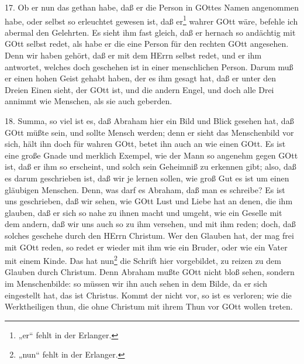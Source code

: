 17. Ob er nun das gethan habe, daß er die Person in GOttes Namen angenommen habe, oder selbst so erleuchtet gewesen ist, daß er\footnote{„er“ fehlt in der Erlanger.} wahrer GOtt wäre, befehle ich abermal den Gelehrten. Es sieht ihm fast gleich, daß er hernach so andächtig mit GOtt selbst redet, als habe er die eine Person für den rechten GOtt angesehen. Denn wir haben gehört, daß er mit dem HErrn selbst redet, und er ihm antwortet, welches doch geschehen ist in einer menschlichen Person. Darum muß er einen hohen Geist gehabt haben, der es ihm gesagt hat, daß er unter den Dreien Einen sieht, der GOtt ist, und die andern Engel, und doch alle Drei annimmt wie Menschen, als sie auch geberden.

18. Summa, so viel ist es, daß Abraham hier ein Bild und Blick gesehen hat, daß GOtt müßte sein, und sollte Mensch werden; denn er sieht das Menschenbild vor sich, hält ihn doch für wahren GOtt, betet ihn auch an wie einen GOtt. Es ist eine große Gnade und merklich Exempel, wie der Mann so angenehm gegen GOtt ist, daß er ihm so erscheint, und solch sein Geheimniß zu erkennen gibt; also, daß es darum geschrieben ist, daß wir je lernen sollen, wie groß Gut es ist um einen gläubigen Menschen. Denn, was darf es Abraham, daß man es schreibe? Es ist uns geschrieben, daß wir sehen, wie GOtt
Lust und Liebe hat an denen, die ihm glauben, daß er sich so nahe zu ihnen macht und umgeht, wie ein Geselle mit dem andern, daß wir uns auch so zu ihm versehen, und mit ihm reden; doch, daß solches geschehe durch den HErrn Christum. Wer den Glauben hat, der mag frei mit GOtt reden, so redet er wieder mit ihm wie ein Bruder, oder wie ein Vater mit einem Kinde. Das hat nun\footnote{„nun“ fehlt in der Erlanger.} die Schrift hier vorgebildet, zu reizen zu dem Glauben durch Christum. Denn Abraham mußte GOtt nicht bloß sehen, sondern im Menschenbilde: so müssen wir ihn auch sehen in dem Bilde, da er sich eingestellt hat, das ist Christus. Kommt der nicht vor, so ist es verloren; wie die Werktheiligen thun, die ohne Christum mit ihrem Thun vor GOtt wollen treten.

